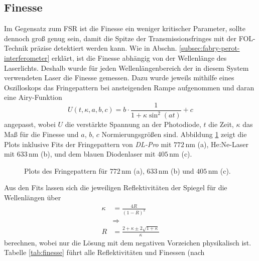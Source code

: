 \subsection{Finesse}\label{subsec:finesse}
Im Gegensatz zum FSR ist die Finesse ein weniger
kritischer Parameter, sollte dennoch groß genug sein, damit die Spitze der
Transmissionsfringes mit der FOL-Technik präzise detektiert werden
kann. Wie in Abschn. \ref{subsec:fabry-perot-interferometer} erklärt, ist
die Finesse abhängig von der Wellenlänge des Laserlichts. Deshalb wurde für jeden
Wellenlängenbereich der in diesem System verwendeten Laser die Finesse
gemessen. Dazu wurde jeweils mithilfe eines Oszilloskops das Fringepattern bei
ansteigenden Rampe aufgenommen und daran eine Airy-Funktion
\begin{equation}\label{eq:finesse_messung_01}
	U(t,\kappa,a,b,c) = b\cdot\frac{1}{1+\kappa \sin^2{(at)}}+c
\end{equation}
angepasst, wobei $U$ die verstärkte Spannung an der Photodiode, $t$ die Zeit,
$\kappa$ das Maß für die Finesse und $a$, $b$, $c$ Normierungsgrößen sind.
Abbildung \ref{fig:finesse_messung} zeigt die Plots inklusive Fits der
Fringepattern von \textit{DL-Pro} mit $772\,$nm (a), He:Ne-Laser mit $633\,$nm (b), und dem
blauen Diodenlaser mit $405\,$nm (c).
\begin{figure}[h]
 	\centering
 	\footnotesize
 	\fbox{\parbox{\dimexpr \linewidth - 2\fboxrule - 2\fboxsep}{
 	\subfloat[]{
		\label{subfig:finesse_messung_a}
		
		}
 	\subfloat[]{
		\label{subfig:finesse_messung_b}
		
		}\\
	\centering
	\subfloat[]{
		\label{subfig:finesse_messung_c}
		
		}
	}}
	\caption[Finesse des FPIs]{Plots des Fringepattern für $772\,$nm (a), $633\,$nm
	(b) und $405\,$nm (c).}
	\label{fig:finesse_messung}
\end{figure}
Aus den Fits lassen sich die jeweiligen Reflektivitäten der Spiegel für die
Wellenlängen über
\begin{equation}\label{eq:finesse_messung_02}
	\begin{split}
		\kappa&=\frac{4R}{(1-R)^2}\\
		&\Rightarrow\\
		R&=\frac{2+\kappa\pm2\sqrt{1+\kappa}}{\kappa}
	\end{split}	
\end{equation}
berechnen, wobei nur die Lösung mit dem negativen Vorzeichen physikalisch ist.
Tabelle \ref{tab:finesse} führt alle Reflektivitäten und Finessen (nach
